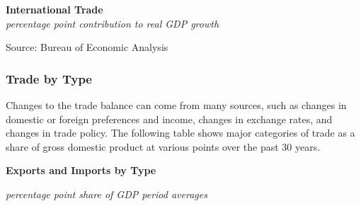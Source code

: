 \documentclass{report}
\makeatletter
\newcommand{\tbllink}[1]{\href{https://raw.githubusercontent.com/bdecon/US-chartbook/master/chartbook/data/#1}{\faTable}}
\newcommand*\short[1]{\expandafter\@gobbletwo\number\numexpr#1\relax}
\newcommand{\sbar}[4]{
		\addplot[ybar stacked, bar width=2.3pt, draw opacity=0, fill=#1] 
			table [x=#2, y=#3, col sep=comma]{#4};}
\newcommand{\dateaxisticks}{
		date coordinates in=x, axis line style={draw=none},
		xmax={2023-11-01},
		max space between ticks=40,	    
		xtick={{1990-01-01}, {1992-01-01}, {1994-01-01}, 
			{1996-01-01}, {1998-01-01}, {2000-01-01}, 
			{2002-01-01}, {2004-01-01}, {2006-01-01},
			{2008-01-01}, {2010-01-01}, {2012-01-01}, {2014-01-01},
		    {2016-01-01}, {2018-01-01}, {2020-01-01}, {2022-01-01}, 
		    {2024-01-01}, {2026-01-01}},
		minor xtick={{1989-01-01}, {1991-01-01}, {1993-01-01},
			{1995-01-01}, {1997-01-01}, {1999-01-01}, 
			{2001-01-01}, {2003-01-01}, {2005-01-01}, {2007-01-01},
		    {2009-01-01}, {2011-01-01}, {2013-01-01}, {2015-01-01},
		    {2017-01-01}, {2019-01-01}, {2021-01-01}, {2023-01-01}, 
		    {2025-01-01}, {2027-01-01}},
		enlarge y limits={0.06}, enlarge x limits={0.01},
		}
\newcommand{\bbar}[2]{extra #1 ticks = {{#2}}, extra #1 tick labels = ,
		extra #1 tick style = {grid=major, grid style={thick, black!25}},}
\newcommand{\rbars}{
		\fill[color=black!10] (axis cs:{1990-07-01},\pgfkeysvalueof{/pgfplots/ymin}) rectangle 
			(axis cs:{1991-03-01}, \pgfkeysvalueof{/pgfplots/ymax});
		\fill[color=black!10] (axis cs:{2007-12-01},\pgfkeysvalueof{/pgfplots/ymin}) rectangle 
			(axis cs:{2009-07-01}, \pgfkeysvalueof{/pgfplots/ymax});
		\fill[color=black!10] (axis cs:{2001-03-01},\pgfkeysvalueof{/pgfplots/ymin}) rectangle 
			(axis cs:{2001-11-01}, \pgfkeysvalueof{/pgfplots/ymax});
		\fill[color=black!10] (axis cs:{2020-02-01},\pgfkeysvalueof{/pgfplots/ymin}) rectangle 
			(axis cs:{2020-05-01}, \pgfkeysvalueof{/pgfplots/ymax});}
\makeatother
\begin{document}
{\begin{minipage}{0.76\textwidth}
 
\vspace{1mm}

\normalsize \textbf{International Trade}\\
\footnotesize{\textit{percentage point contribution to real GDP growth}}
\vspace{6.4cm}

\hspace{2mm} 

\footnotesize{Source: Bureau of Economic Analysis} \hfill \tbllink{nx.csv}
\end{minipage}
\newpage
\begin{minipage}{0.76\textwidth} 
\subsubsection*{Trade by Type} 
\small Changes to the trade balance can come from many sources, such as changes in domestic or foreign preferences and income, changes in exchange rates, and changes in trade policy. The following table shows major categories of trade as a share of gross domestic product at various points over the past 30 years. 
\vspace{1mm}

\normalsize \textbf{Exports and Imports by Type}\\
\footnotesize{\textit{percentage point share of GDP \hspace{38mm} period averages}\\ 
 \setlength{\tabcolsep}{3.1pt} \color{black!90}
	{\renewcommand{\arraystretch}{1.58}
\hspace*{-1mm} \begin{tabular}{p{42mm} R{7.1mm} R{7.1mm} R{7.1mm} R{7.1mm} R{7.1mm} 
		   R{7.1mm} R{7.1mm} R{7.1mm} }
			  \hline
		\end{tabular}}\vspace{-2mm}
		
}
\end{minipage}}
\end{document}
